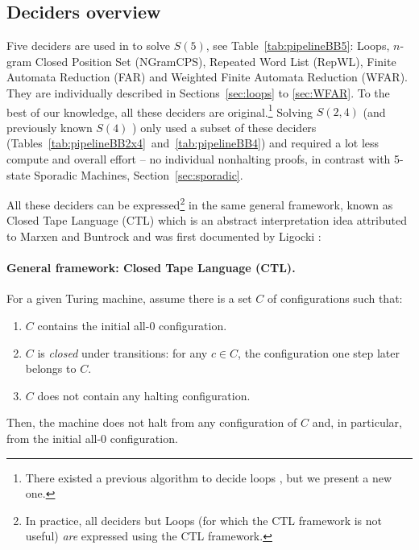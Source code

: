 \newpage

\subsection{Deciders overview}\label{sec:deciders-overview}

Five deciders are used in \CoqBB to solve $S(5)$, see Table~\ref{tab:pipelineBB5}: Loops, $n$-gram Closed Position Set (NGramCPS), Repeated Word List (RepWL), Finite Automata Reduction (FAR) and Weighted Finite Automata Reduction (WFAR). They are individually described in Sections~\ref{sec:loops} to \ref{sec:WFAR}. To the best of our knowledge, all these deciders are original.\footnote{There existed a previous algorithm to decide loops \cite{Lin1963}, but we present a new one.} Solving $S(2,4)$ (and previously known $S(4)$ \cite{Brady83}) only used  a subset of these deciders (Tables~\ref{tab:pipelineBB2x4}~and~\ref{tab:pipelineBB4}) and required a lot less compute and overall effort -- \eg no individual nonhalting proofs, in contrast with 5-state Sporadic Machines, Section~\ref{sec:sporadic}.

All these deciders can be expressed\footnote{In practice, all deciders but Loops (for which the CTL framework is not useful) \textit{are} expressed using the CTL framework.} in the same general framework, known as Closed Tape Language (CTL) which is an abstract interpretation idea attributed to Marxen and Buntrock and was first documented by Ligocki \cite{ShawnCTL}:
\vspace{-1ex}
\paragraph{General framework: Closed Tape Language (CTL).} For a given Turing machine, assume there is a set $C$ of configurations such that:
\begin{enumerate}
  \item $C$ contains the initial all-0 configuration.
  \item $C$ is \textit{closed} under transitions: for any $c \in C$, the configuration one step later belongs to $C$.
  \item $C$ does not contain any halting configuration.
\end{enumerate}


Then, the machine does not halt from any configuration of $C$ and, in particular, from the initial all-0 configuration.

\vspace{-1ex}
